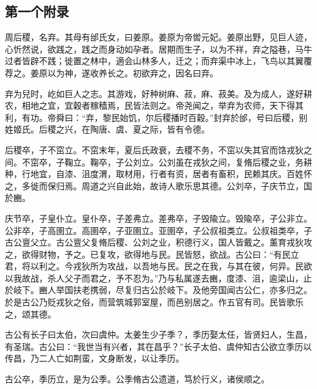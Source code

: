 \documentclass[UTF8,12pt,AutoFakeBold,fontset=fandol]{ctexart}
\begin{document}
	\begin{appendices}
		\setcounter{table}{0}
		\setcounter{figure}{0}
		\setcounter{equation}{0}
		\renewcommand{\thetable}{\thesection-\arabic{table}}
		\renewcommand{\theequation}{\thesection-\arabic{equation}}
		\renewcommand{\thefigure}{\thesection-\arabic{figure}}
		
		
		
		
		\section{第一个附录\label{附录：第一个附录}}
		周后稷，名弃。其母有邰氏女，曰姜原。姜原为帝喾元妃。姜原出野，见巨人迹，心忻然说，欲践之，践之而身动如孕者。居期而生子，以为不祥，弃之隘巷，马牛过者皆辟不践；徙置之林中，適会山林多人，迁之；而弃渠中冰上，飞鸟以其翼覆荐之。姜原以为神，遂收养长之。初欲弃之，因名曰弃。
		
		弃为兒时，屹如巨人之志。其游戏，好种树麻、菽，麻、菽美。及为成人，遂好耕农，相地之宜，宜穀者稼穑焉，民皆法则之。帝尧闻之，举弃为农师，天下得其利，有功。帝舜曰：“弃，黎民始饥，尔后稷播时百穀。”封弃於邰，号曰后稷，别姓姬氏。后稷之兴，在陶唐、虞、夏之际，皆有令德。
		
		后稷卒，子不窋立。不窋末年，夏后氏政衰，去稷不务，不窋以失其官而饹戎狄之间。不窋卒，子鞠立。鞠卒，子公刘立。公刘虽在戎狄之间，复脩后稷之业，务耕种，行地宜，自漆、沮度渭，取材用，行者有资，居者有畜积，民赖其庆。百姓怀之，多徙而保归焉。周道之兴自此始，故诗人歌乐思其德。公刘卒，子庆节立，国於豳。
		
		庆节卒，子皇仆立。皇仆卒，子差弗立。差弗卒，子毁隃立。毁隃卒，子公非立。公非卒，子高圉立。高圉卒，子亚圉立。亚圉卒，子公叔祖类立。公叔祖类卒，子古公亶父立。古公亶父复脩后稷、公刘之业，积德行义，国人皆戴之。薰育戎狄攻之，欲得财物，予之。已复攻，欲得地与民。民皆怒，欲战。古公曰：“有民立君，将以利之。今戎狄所为攻战，以吾地与民。民之在我，与其在彼，何异。民欲以我故战，杀人父子而君之，予不忍为。”乃与私属遂去豳，度漆、沮，逾梁山，止於岐下。豳人举国扶老携弱，尽复归古公於岐下。及他旁国闻古公仁，亦多归之。於是古公乃贬戎狄之俗，而营筑城郭室屋，而邑别居之。作五官有司。民皆歌乐之，颂其德。
		
		古公有长子曰太伯，次曰虞仲。太姜生少子季？，季历娶太任，皆贤妇人，生昌，有圣瑞。古公曰：“我世当有兴者，其在昌乎？”长子太伯、虞仲知古公欲立季历以传昌，乃二人亡如荆蛮，文身断发，以让季历。
		
		古公卒，季历立，是为公季。公季脩古公遗道，笃於行义，诸侯顺之。
		

\end{appendices}
\end{document}
